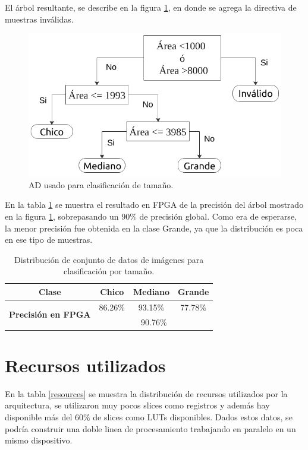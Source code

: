 \documentclass[twoside,spanish,ESP,MSc]{plantillaLabUPV}
\theoremstyle{definition}
\begin{document}
El árbol resultante, se describe en la figura \ref{adareas}, en donde se agrega la directiva de muestras inválidas.

\begin{figure} 
	\centering
	\includegraphics[width=0.8\linewidth]{edrawimas/arboldeareas}
	\caption{AD usado para clasificación de tamaño.}
	\label{adareas}
\end{figure}

En la tabla \ref{acctam} se muestra el resultado en FPGA de la precisión del árbol mostrado en la figura \ref{adareas}, sobrepasando un 90\% de precisión global. Como era de esperarse, la menor precisión fue obtenida en la clase Grande, ya que la distribución es poca en ese tipo de muestras. 

\begin{table}[!tbh]
	\caption{Distribución de conjunto de datos de imágenes para clasificación por tamaño.}
	\label{acctam}
	\centering
	\begin{tabular}{|c|c|c|c|}
		\hline
		\textbf{Clase}                              & \textbf{Chico} & \textbf{Mediano} & \textbf{Grande} \\ \hline
		\multirow{2}{*}{\textbf{Precisión en FPGA}} & 86.26\%        & 93.15\%          & 77.78\%         \\ \cline{2-4} 
		& \multicolumn{3}{c|}{90.76\%}                        \\ \hline
	\end{tabular}
\end{table}


\newpage
\section{Recursos utilizados}
En la tabla \ref{resources} se muestra la distribución de recursos utilizados por la arquitectura, se utilizaron muy pocos slices como registros y además hay disponible más del 60\% de slices como LUTs disponibles. Dados estos datos, se podría construir una doble linea de procesamiento trabajando en paralelo en un mismo dispositivo. 
\end{document}
